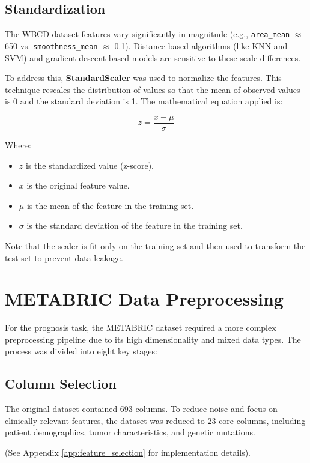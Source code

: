 \subsection{Standardization}
The WBCD dataset features vary significantly in magnitude (e.g., \texttt{area\_mean} $\approx$ 650 vs. \texttt{smoothness\_mean} $\approx$ 0.1). Distance-based algorithms (like KNN and SVM) and gradient-descent-based models are sensitive to these scale differences.

To address this, \textbf{StandardScaler} was used to normalize the features. This technique rescales the distribution of values so that the mean of observed values is 0 and the standard deviation is 1. The mathematical equation applied is:

\begin{equation}
    z = \frac{x - \mu}{\sigma}
\end{equation}

Where:
\begin{itemize}
    \item $z$ is the standardized value (z-score).
    \item $x$ is the original feature value.
    \item $\mu$ is the mean of the feature in the training set.
    \item $\sigma$ is the standard deviation of the feature in the training set.
\end{itemize}
Note that the scaler is fit only on the training set and then used to transform the test set to prevent data leakage.

\section{METABRIC Data Preprocessing}
For the prognosis task, the METABRIC dataset required a more complex preprocessing pipeline due to its high dimensionality and mixed data types. The process was divided into eight key stages:

\subsection{Column Selection}
The original dataset contained 693 columns. To reduce noise and focus on clinically relevant features, the dataset was reduced to 23 core columns, including patient demographics, tumor characteristics, and genetic mutations.

(See Appendix \ref{app:feature_selection} for implementation details).

